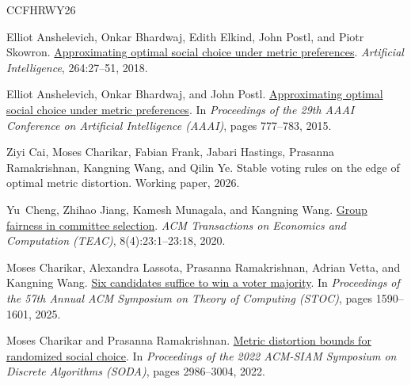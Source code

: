 \documentclass[11pt]{article}
\numberwithin{equation}{section}
\theoremstyle{plain}
\theoremstyle{definition}
\newcommand{\1}{\mathbf{1}}
\begin{document}
\begingroup
\small
{}
\begin{thebibliography}{CCFHRWY26}

Elliot Anshelevich, Onkar Bhardwaj, Edith Elkind, John Postl, and Piotr Skowron.
\newblock \href{https://doi.org/10.1016/j.artint.2018.07.006}{Approximating optimal social choice under metric preferences}.
\newblock \emph{Artificial Intelligence}, 264:27--51, 2018.

Elliot Anshelevich, Onkar Bhardwaj, and John Postl.
\newblock \href{https://doi.org/10.1609/aaai.v29i1.9308}{Approximating optimal social choice under metric preferences}.
\newblock In \emph{Proceedings of the 29th AAAI Conference on Artificial Intelligence (AAAI)}, pages 777--783, 2015.

Ziyi Cai, Moses Charikar, Fabian Frank, Jabari Hastings, Prasanna Ramakrishnan, Kangning Wang, and Qilin Ye.
\newblock Stable voting rules on the edge of optimal metric distortion.
\newblock Working paper, 2026.

Yu~Cheng, Zhihao Jiang, Kamesh Munagala, and Kangning Wang.
\newblock \href{https://doi.org/10.1145/3417750}{Group fairness in committee selection}.
\newblock \emph{ACM Transactions on Economics and Computation (TEAC)}, 8(4):23:1--23:18, 2020.

Moses Charikar, Alexandra Lassota, Prasanna Ramakrishnan, Adrian Vetta, and Kangning Wang.
\newblock \href{https://doi.org/10.1145/3717823.3718235}{Six candidates suffice to win a voter majority}.
\newblock In \emph{Proceedings of the 57th Annual ACM Symposium on Theory of Computing (STOC)}, pages 1590--1601, 2025.

Moses Charikar and Prasanna Ramakrishnan.
\newblock \href{https://doi.org/10.1137/1.9781611977073.116}{Metric distortion bounds for randomized social choice}.
\newblock In \emph{Proceedings of the 2022 ACM-SIAM Symposium on Discrete Algorithms (SODA)}, pages 2986--3004, 2022.


\end{thebibliography}
\end{document}
